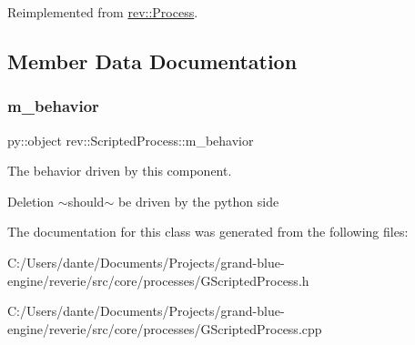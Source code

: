 Reimplemented from \mbox{\hyperlink{classrev_1_1_process_a7f5a6ab8af65aec3132f6a072b9fcb87}{rev\+::\+Process}}.



\subsection{Member Data Documentation}
\mbox{\label{classrev_1_1_scripted_process_a0ac5ba59dc533ad82292f46208c61fb5}} 
\subsubsection{\texorpdfstring{m\_behavior}{m\_behavior}}
{\footnotesize\ttfamily py\+::object rev\+::\+Scripted\+Process\+::m\+\_\+behavior\hspace{0.3cm}{\ttfamily [protected]}}



The behavior driven by this component. 

Deletion $\sim$should$\sim$ be driven by the python side 

The documentation for this class was generated from the following files\+:\begin{DoxyCompactItemize}
\item 
C\+:/\+Users/dante/\+Documents/\+Projects/grand-\/blue-\/engine/reverie/src/core/processes/G\+Scripted\+Process.\+h\item 
C\+:/\+Users/dante/\+Documents/\+Projects/grand-\/blue-\/engine/reverie/src/core/processes/G\+Scripted\+Process.\+cpp\end{DoxyCompactItemize}
